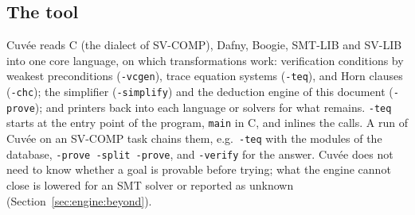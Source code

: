 \documentclass[11pt,a4paper]{article}
\newcommand{\cuvee}{Cuvée}
\begin{document}
\subsection{The tool}
\cuvee{} reads C (the dialect of SV-COMP), Dafny, Boogie, SMT-LIB and SV-LIB into one core language, on which
transformations work: verification conditions by weakest preconditions (\texttt{-vcgen}), trace equation systems
(\texttt{-teq}), and Horn clauses (\texttt{-chc}); the simplifier (\texttt{-simplify}) and the deduction engine of this
document (\texttt{-prove}); and printers back into each language or solvers for what remains. \texttt{-teq} starts at the
entry point of the program, \texttt{main} in C, and inlines the calls. A run of \cuvee{} on an SV-COMP task chains them,
e.g.\ \texttt{-teq} with the modules of the database, \texttt{-prove -split -prove}, and \texttt{-verify} for the answer.
\cuvee{} does not need to know whether a goal is provable before trying; what the engine cannot close is lowered for an
SMT solver or reported as unknown (Section~\ref{sec:engine:beyond}).
\end{document}
